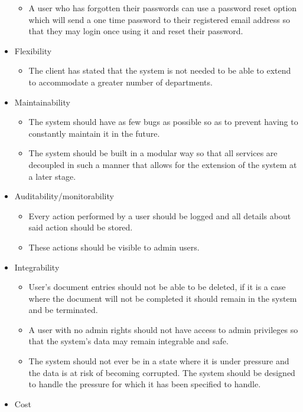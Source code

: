 \documentclass{article}
\begin{document}
\begin{itemize}
\begin{itemize}
					\item A user who has forgotten their passwords can use a password reset option which will send a one time password to their registered email address so that they may login once using it and reset their password.
				\end{itemize}
				\item Flexibility
				\begin{itemize}
					\item The client has stated that the system is not needed to be able to extend to accommodate a greater number of departments.
				\end{itemize}
				\item Maintainability
				\begin{itemize}
					\item The system should have as few bugs as possible so as to prevent having to constantly maintain it in the future.
					\item The system should be built in a modular way so that all services are decoupled in such a manner that allows for the extension of the system at a later stage.
				\end{itemize}
				\item Auditability/monitorability
				\begin{itemize}
					\item Every action performed by a user should be logged and all details about said action should be stored.
					\item These actions should be visible to admin users.
				\end{itemize}
				\item Integrability
				\begin{itemize}
					\item User's document entries should not be able to be deleted, if it is a case where the document will not be completed it should remain in the system and be terminated.
					\item A user with no admin rights should not have access to admin privileges so that the system's data may remain integrable and safe.
					\item The system should not ever be in a state where it is under pressure and the data is at risk of becoming corrupted. The system should be designed to handle the pressure for which it has been specified to handle.
				\end{itemize}
				\item Cost
				\begin{itemize}

\end{itemize}
\end{itemize}
\end{document}
